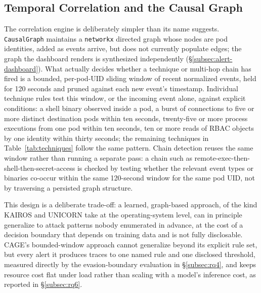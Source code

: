 \documentclass{ieeeaccess}
\begin{document}
\subsection{Temporal Correlation and the Causal Graph}
\label{subsec:temporal-correlation}

The correlation engine is deliberately simpler than its name suggests.
\texttt{CausalGraph} maintains a \texttt{networkx} directed graph whose nodes are pod
identities, added as events arrive, but does not currently populate
edges; the graph the dashboard renders is synthesized independently
(\S\ref{subsec:alert-dashboard}). What actually decides whether a
technique or multi-hop chain has fired is a bounded, per-pod-UID
sliding window of recent normalized events, held for 120 seconds and
pruned against each new event's timestamp. Individual technique rules
test this window, or the incoming event alone, against explicit
conditions: a shell binary observed inside a pod, a burst of
connections to five or more distinct destination pods within ten
seconds, twenty-five or more process executions from one pod within
ten seconds, ten or more reads of RBAC objects by one identity within
thirty seconds; the remaining techniques in Table~\ref{tab:techniques}
follow the same pattern. Chain detection reuses the same window rather
than running a separate pass: a chain such as
remote-exec-then-shell-then-secret-access is checked by testing
whether the relevant event types or binaries co-occur within the same
120-second window for the same pod UID, not by traversing a persisted
graph structure.

This design is a deliberate trade-off: a learned, graph-based approach,
of the kind KAIROS \cite{ref12} and UNICORN \cite{ref5} take at the
operating-system level, can in principle generalize to attack patterns
nobody enumerated in advance, at the cost of a decision boundary that
depends on training data and is not fully disclosable. CAGE's
bounded-window approach cannot generalize beyond its explicit rule set,
but every alert it produces traces to one named rule and one disclosed
threshold, measured directly by the evasion-boundary evaluation in
\S\ref{subsec:rq4}, and keeps resource cost flat under load rather than
scaling with a model's inference cost, as reported in \S\ref{subsec:rq6}.
\end{document}
